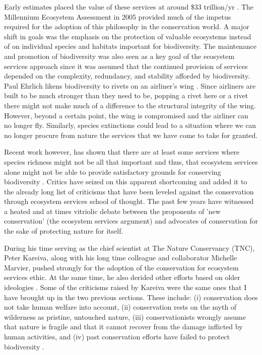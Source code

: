 \documentclass[rutwik_proposal.tex]{subfiles}
\begin{document}
Early estimates placed the value of these services at around \$33 trillion/yr \cite{dArge97}. The Millennium Ecosystem Assessment in 2005 provided much of the impetus required for the adoption of this philosophy in the conservation world. A major shift in goals was the emphasis on the protection of valuable ecosystems instead of on individual species and habitats important for biodiversity. The maintenance and promotion of biodiversity was also seen as a key goal of the ecosystem services approach since it was assumed that the continued provision of services depended on the complexity, redundancy, and stability afforded by biodiversity. Paul Ehrlich likens biodiversity to rivets on an airliner's wing \cite{Ehrlichs81}. Since airliners are built to be much stronger than they need to be, popping a rivet here or a rivet there might not make much of a difference to the structural integrity of the wing. However, beyond a certain point, the wing is compromised and the airliner can no longer fly. Similarly, species extinctions could lead to a situation where we can no longer procure from nature the services that we have come to take for granted.

Recent work however, has shown that there are at least some services where species richness might not be all that important and thus, that ecosystem services alone might not be able to provide satisfactory grounds for conserving biodiversity \cite{Winfree15, Ridder08}. Critics have seized on this apparent shortcoming and added it to the already long list of criticisms that have been leveled against the conservation through ecosystem services school of thought. The past few years have witnessed a heated and at times vitriolic debate between the proponents of 'new conservation' (the ecosystem services argument) and advocates of conservation for the sake of protecting nature for itself.

During his time serving as the chief scientist at The Nature Conservancy (TNC), Peter Kareiva, along with his long time colleague and collaborator Michelle Marvier, pushed strongly for the adoption of the conservation for ecosystem services ethic. At the same time, he also derided other efforts based on older ideologies \cite{Kareiva07, Kareiva12}. Some of the criticisms raised by Kareiva were the same ones that I have brought up in the two previous sections. These include: (i) conservation does not take human welfare into account, (ii) conservation rests on the myth of wilderness as pristine, untouched nature, (iii) conservationists wrongly assume that nature is fragile and that it cannot recover from the damage inflicted by human activities, and (iv) past conservation efforts have failed to protect biodiversity \cite{Kareiva07, Kareiva12}. 
\end{document}
